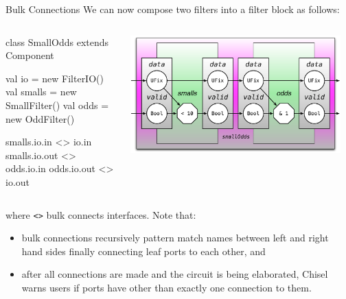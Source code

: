 \documentclass[xcolor=pdflatex,dvipsnames,table]{beamer}
\begin{document}
\begin{frame}[fragile]{Bulk Connections}
We can now compose two filters into a filter block as follows:

\begin{columns}

{
\begin{scala}
class SmallOdds extends Component { 
  val io     = new FilterIO()
  val smalls = new SmallFilter()
  val odds   = new OddFilter()

  smalls.io.in  <> io.in
  smalls.io.out <> odds.io.in
  odds.io.out   <> io.out
}
\end{scala}
}


\begin{center}
\includegraphics[width=0.95\textwidth]{figs/small-odds.pdf} 
\end{center}

\end{columns}

\noindent
where \verb+<>+ bulk connects interfaces.  Note that:
\begin{itemize}
\item bulk connections recursively pattern match names between left and right hand sides finally connecting leaf ports to each other, and
\item after all connections are made and the circuit is being elaborated,
Chisel warns users if ports have other than exactly one connection to them.
\end{itemize}
\end{frame}
\end{document}
